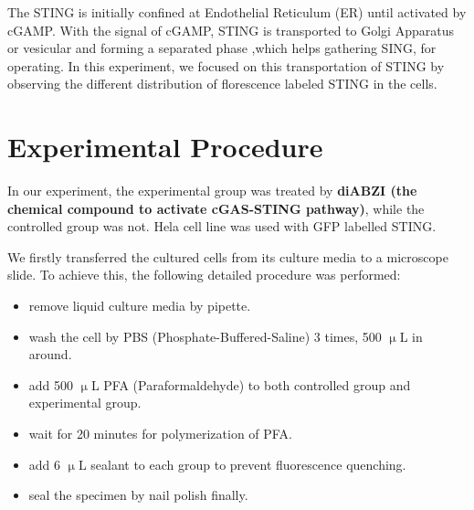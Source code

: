 \documentclass[UTF-8]{article}
\begin{document}
The STING is initially confined at Endothelial Reticulum (ER) until activated by cGAMP.
With the signal of cGAMP, STING is transported to Golgi Apparatus or vesicular and forming a separated phase ,which helps gathering SING, for operating.
In this experiment, we focused on this transportation of STING by observing the different distribution of florescence labeled STING in the cells.

\section{Experimental Procedure}
In our experiment, the experimental group was treated by \textbf{diABZI (the chemical compound to activate cGAS-STING pathway)}, while the controlled group was not.
Hela cell line was used with GFP labelled STING.

We firstly transferred the cultured cells from its culture media to a microscope slide.
To achieve this, the following detailed procedure was performed:
\begin{itemize}
    \item remove liquid culture media by pipette.
    \item wash the cell by PBS (Phosphate-Buffered-Saline) 3 times, 500 $\upmu$L in around.
    \item add 500 $\upmu$L PFA (Paraformaldehyde) to both controlled group and experimental group.
    \item wait for 20 minutes for polymerization of PFA.
    \item add 6 $\upmu$L sealant to each group to prevent fluorescence quenching.
    \item seal the specimen by nail polish finally.
\end{itemize}
\end{document}
